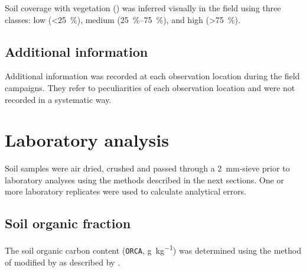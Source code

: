 Soil coverage with vegetation (\textt) was inferred visually in the field using three classes: 
low (\SI{<25}{\percent}), medium (\SIrange{25}{75}{\percent}), and high (\SI{>75}{\percent}).

\tocless\subsection{Additional information}

Additional information was recorded at each observation location during the field campaigns. They refer to 
peculiarities of each observation location and were not recorded in a systematic way.

\tocless\section{Laboratory analysis}

Soil samples were air dried, crushed and passed through a \SI{2}{\milli\metre}-sieve prior to laboratory 
analyses using the methods described in the next sections. One or more laboratory replicates were used to 
calculate analytical errors.

\tocless\subsection{Soil organic fraction}

The soil organic carbon content (\texttt{ORCA}, \si{\gram\per\kilo\gram}) was determined using the method of
 modified by  as described by
.

